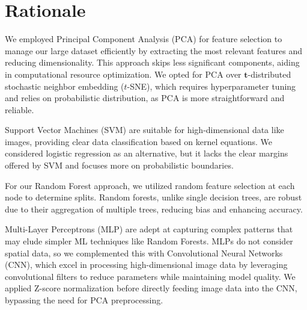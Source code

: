 \section{Rationale}
\label{sec:Rationale}
We employed Principal Component Analysis (PCA) for feature selection to manage our large dataset efficiently by extracting the most relevant features and reducing dimensionality. This approach skips less significant components, aiding in computational resource optimization. We opted for PCA over $\mathbf{t}$-distributed stochastic neighbor embedding ($t$-SNE), which requires hyperparameter tuning and relies on probabilistic distribution, as PCA is more straightforward and reliable.

Support Vector Machines (SVM) are suitable for high-dimensional data like images, providing clear data classification based on kernel equations. We considered logistic regression as an alternative, but it lacks the clear margins offered by SVM and focuses more on probabilistic boundaries.

For our Random Forest approach, we utilized random feature selection at each node to determine splits. Random forests, unlike single decision trees, are robust due to their aggregation of multiple trees, reducing bias and enhancing accuracy.

Multi-Layer Perceptrons (MLP) are adept at capturing complex patterns that may elude simpler ML techniques like Random Forests. MLPs do not consider spatial data, so we complemented this with Convolutional Neural Networks (CNN), which excel in processing high-dimensional image data by leveraging convolutional filters to reduce parameters while maintaining model quality. We applied Z-score normalization before directly feeding image data into the CNN, bypassing the need for PCA preprocessing.
